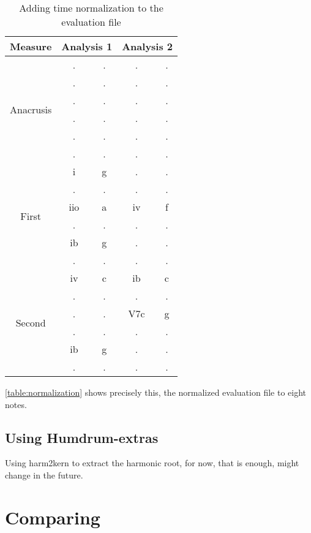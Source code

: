 		\begin{table}[tbp]
		\centering
		\begin{tabular}{|c|c|c|c|c|}
		\hline
		Measure & \multicolumn{2}{c|}{Analysis 1} & \multicolumn{2}{c|}{Analysis 2} \\ \hline
		\multirow{6}{*}{Anacrusis} & . & . & . & . \\ \cline{2-5}
		 & . & . & . & . \\ \cline{2-5}
		 & . & . & . & . \\ \cline{2-5}
		 & . & . & . & . \\ \cline{2-5}
		 & . & . & . & . \\ \cline{2-5}
		 & . & . & . & . \\ \hline
		\multirow{6}{*}{First} & i & g & . & . \\ \cline{2-5}
		 & . & . & . & . \\ \cline{2-5}
		 & iio & a & iv & f \\ \cline{2-5}
		 & . & . & . & . \\ \cline{2-5}
		 & ib & g & . & . \\ \cline{2-5}
		 & . & . & . & . \\ \hline
		\multirow{6}{*}{Second} & iv & c & ib & c \\ \cline{2-5}
		 & . & . & . & . \\ \cline{2-5}
		 & . & . & V7c & g \\ \cline{2-5}
		 & . & . & . & . \\ \cline{2-5}
		 & ib & g & . & . \\ \cline{2-5}
		 & . & . & . & . \\ \hline
		\end{tabular}
		\caption{Adding time normalization to the evaluation file}
		\label{table:normalization}
		\end{table}

		\autoref{table:normalization} shows precisely this, the normalized evaluation file to eight notes.

	\subsection{Using Humdrum-extras}
  Using harm2kern to extract the harmonic root, for now, that is enough, might change in the future.
\section{Comparing}
